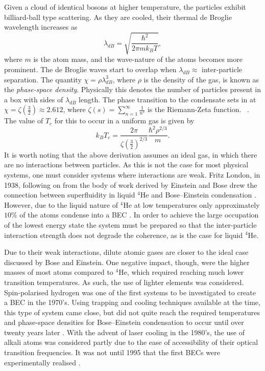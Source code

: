 Given a cloud of identical bosons at higher temperature, the particles exhibit billiard-ball type scattering. As they are cooled, their thermal de Broglie wavelength increases as
\begin{equation}
\lambda_{dB} = \sqrt{\frac{\hbar^2}{2\pi mk_{B}T}},
\end{equation}
where $m$ is the atom mass, and the wave-nature of the atoms becomes more prominent. The de Broglie waves start to overlap when $\lambda_{dB} \approx$ inter-particle separation. The quantity $\chi=\rho\lambda_{dB}^3$, where $\rho$ is the density of the gas, is known as the \emph{phase-space density}. Physically this denotes the number of particles present in a box with sides of $\lambda_{dB}$ length. The phase transition to the condensate sets in at $\chi = \zeta\left(\frac{3}{2}\right)\approx 2.612$, where $\zeta(s) = \displaystyle\sum\limits_{n=1}^{\infty}\frac{1}{n^s}$ is the Riemann-Zeta function. ~\cite{BK:Ueda_2010}. The value of $T_c$ for this to occur in a uniform gas is given by
\begin{equation}
k_BT_c = \frac{2\pi}{\zeta\left(\frac{3}{2}\right)^{2/3}}\frac{\hbar^2\rho^{2/3}}{m}.
\end{equation}
It is worth noting that the above derivation assumes an ideal gas, in which there are no interactions between particles. As this is not the case for most physical systems, one must consider systems where interactions are weak. Fritz London, in 1938, following on from the body of work derived by Einstein and Bose drew the connection between superfluidity in liquid $^4$He and Bose--Einstein condensation \cite[Chap.~1]{BK:Pitaevskii_Stringari_2003}. However, due to the liquid nature of $^4$He at low temperatures only approximately $10\%$ of the atoms condense into a BEC \cite{BEC:Penrose_pr_1956}. In order to achieve the large occupation of the lowest energy state the system must be prepared so that the inter-particle interaction strength does not degrade the coherence, as is the case for liquid $^4$He.

Due to their weak interactions, dilute atomic gases are closer to the ideal case discussed by Bose and Einstein. One negative impact, though, were the higher masses of most atoms compared to $^4$He, which required reaching much lower transition temperatures. As such, the use of lighter elements was considered. Spin-polarised hydrogen was one of the first systems to be investigated to create a BEC \cite{BEC:Kleppner_enfe_1998,BEC:Fried_prl_1998,BK:Pitaevskii_Stringari_2003} in the 1970's. Using trapping and cooling techniques available at the time, this type of system came close, but did not quite reach the required temperatures and phase-space densities for Bose--Einstein condensation to occur until over twenty years later \cite{BEC:Fried_prl_1998}. With the advent of laser cooling in the 1980's, the use of alkali atoms was considered partly due to the ease of accessibility of their optical transition frequencies. It was not until 1995 that the first BECs were experimentally realised \cite{BEC:Cornell_science_1995,BEC:Ketterle_prl_1995}.

